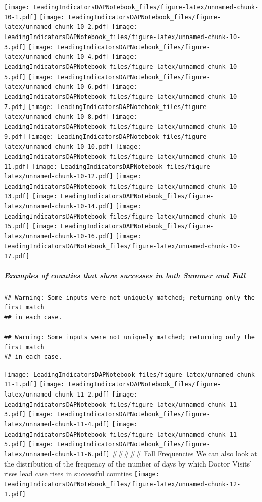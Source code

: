 \documentclass[]{article}
\let\oldsubparagraph\subparagraph
\renewcommand{\subparagraph}[1]{\oldsubparagraph{#1}\mbox{}}
\begin{document}
\texttt{[image: LeadingIndicatorsDAPNotebook\_files/figure-latex/unnamed-chunk-10-1.pdf]}
\texttt{[image: LeadingIndicatorsDAPNotebook\_files/figure-latex/unnamed-chunk-10-2.pdf]}
\texttt{[image: LeadingIndicatorsDAPNotebook\_files/figure-latex/unnamed-chunk-10-3.pdf]}
\texttt{[image: LeadingIndicatorsDAPNotebook\_files/figure-latex/unnamed-chunk-10-4.pdf]}
\texttt{[image: LeadingIndicatorsDAPNotebook\_files/figure-latex/unnamed-chunk-10-5.pdf]}
\texttt{[image: LeadingIndicatorsDAPNotebook\_files/figure-latex/unnamed-chunk-10-6.pdf]}
\texttt{[image: LeadingIndicatorsDAPNotebook\_files/figure-latex/unnamed-chunk-10-7.pdf]}
\texttt{[image: LeadingIndicatorsDAPNotebook\_files/figure-latex/unnamed-chunk-10-8.pdf]}
\texttt{[image: LeadingIndicatorsDAPNotebook\_files/figure-latex/unnamed-chunk-10-9.pdf]}
\texttt{[image: LeadingIndicatorsDAPNotebook\_files/figure-latex/unnamed-chunk-10-10.pdf]}
\texttt{[image: LeadingIndicatorsDAPNotebook\_files/figure-latex/unnamed-chunk-10-11.pdf]}
\texttt{[image: LeadingIndicatorsDAPNotebook\_files/figure-latex/unnamed-chunk-10-12.pdf]}
\texttt{[image: LeadingIndicatorsDAPNotebook\_files/figure-latex/unnamed-chunk-10-13.pdf]}
\texttt{[image: LeadingIndicatorsDAPNotebook\_files/figure-latex/unnamed-chunk-10-14.pdf]}
\texttt{[image: LeadingIndicatorsDAPNotebook\_files/figure-latex/unnamed-chunk-10-15.pdf]}
\texttt{[image: LeadingIndicatorsDAPNotebook\_files/figure-latex/unnamed-chunk-10-16.pdf]}
\texttt{[image: LeadingIndicatorsDAPNotebook\_files/figure-latex/unnamed-chunk-10-17.pdf]}

\hypertarget{examples-of-counties-that-show-successes-in-both-summer-and-fall}{%
\subparagraph{Examples of counties that show successes in both Summer
and
Fall}\label{examples-of-counties-that-show-successes-in-both-summer-and-fall}}

\begin{verbatim}
## Warning: Some inputs were not uniquely matched; returning only the first match
## in each case.

## Warning: Some inputs were not uniquely matched; returning only the first match
## in each case.
\end{verbatim}

\texttt{[image: LeadingIndicatorsDAPNotebook\_files/figure-latex/unnamed-chunk-11-1.pdf]}
\texttt{[image: LeadingIndicatorsDAPNotebook\_files/figure-latex/unnamed-chunk-11-2.pdf]}
\texttt{[image: LeadingIndicatorsDAPNotebook\_files/figure-latex/unnamed-chunk-11-3.pdf]}
\texttt{[image: LeadingIndicatorsDAPNotebook\_files/figure-latex/unnamed-chunk-11-4.pdf]}
\texttt{[image: LeadingIndicatorsDAPNotebook\_files/figure-latex/unnamed-chunk-11-5.pdf]}
\texttt{[image: LeadingIndicatorsDAPNotebook\_files/figure-latex/unnamed-chunk-11-6.pdf]}
\#\#\#\#\# Fall Frequencies We can also look at the distribution of the
frequency of the number of days by which Doctor Visits' rises lead case
rises in successful counties
\texttt{[image: LeadingIndicatorsDAPNotebook\_files/figure-latex/unnamed-chunk-12-1.pdf]}
\end{document}
